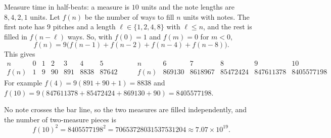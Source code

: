 Measure time in half-beats: a measure is $10$ units and the note lengths are $8,4,2,1$ units. Let $f(n)$ be the number of ways to fill $n$ units with notes. The first note has $9$ pitches and a length $\ell\in\{1,2,4,8\}$ with $\ell\le n$, and the rest is filled in $f(n-\ell)$ ways. So, with $f(0)=1$ and $f(m)=0$ for $m<0$,
\[
f(n)=9\bigl(f(n-1)+f(n-2)+f(n-4)+f(n-8)\bigr).
\]
This gives
\[
\begin{array}{c|cccccc}
n&0&1&2&3&4&5\\\hline
f(n)&1&9&90&891&8838&87642
\end{array}
\qquad
\begin{array}{c|ccccc}
n&6&7&8&9&10\\\hline
f(n)&869130&8618967&85472424&847611378&8405577198
\end{array}
\]
For example $f(4)=9(891+90+1)=8838$ and $f(10)=9(847611378+85472424+869130+90)=8405577198$.

No note crosses the bar line, so the two measures are filled independently, and the number of two-measure pieces is
\[
f(10)^2=8405577198^2=\boxed{70653728031537531204}\approx7.07\times10^{19}.
\]
